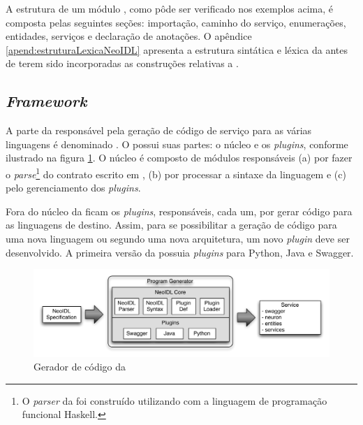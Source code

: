A estrutura de um módulo \neoidl{}, como pôde ser verificado nos exemplos
acima, é composta pelas seguintes seções: importação, caminho do serviço,
enumerações, entidades, serviços e declaração de anotações. O apêndice 
\ref{apend:estruturaLexicaNeoIDL} apresenta a estrutura sintática e léxica da
\neoidl{} antes de terem sido incorporadas as construções
relativas a \designbycontract{}.




\subsection{\textit{Framework}}
\label{frameNeoIDL}
\vspace{-6mm}

A parte da \neoidl{} responsável pela geração de código de
serviço para as várias linguagens é denominado \framework{} \neoidl{}. O
\framework{} \neoidl{} possui suas partes: o núcleo e os \textit{plugins},
conforme ilustrado na figura \ref{fig:programGenerator}.
O núcleo é composto de módulos responsáveis (a) por fazer o \textit{parse}\footnote{O \textit{parser} da \neoidl{}
foi construído utilizando \bnfc{} \cite{ranta-bnfc:2012} com a linguagem de
programação funcional Haskell.}
do contrato escrito em \neoidl{}, (b) por processar a sintaxe da linguagem \neoidl{} e (c) pelo gerenciamento dos \textit{plugins}.

Fora do núcleo da \neoidl{} ficam os \textit{plugins}, responsáveis,
cada um, por gerar código para as linguagens de destino. Assim, para se
possibilitar a geração de código para uma nova linguagem ou segundo uma nova arquitetura, um
novo \textit{plugin} deve ser desenvolvido. A primeira versão da \neoidl{}
possuia \textit{plugins} para Python, Java e Swagger.

\begin{figure}[h]
\begin{center}
\includegraphics[scale=0.55,trim=0cm 1.5cm 0cm 0cm]{programgenerator.pdf}
\vspace{-.5cm}
\end{center}
\caption{Gerador de código da \neoidl{}}
\label{fig:programGenerator}
\end{figure}

